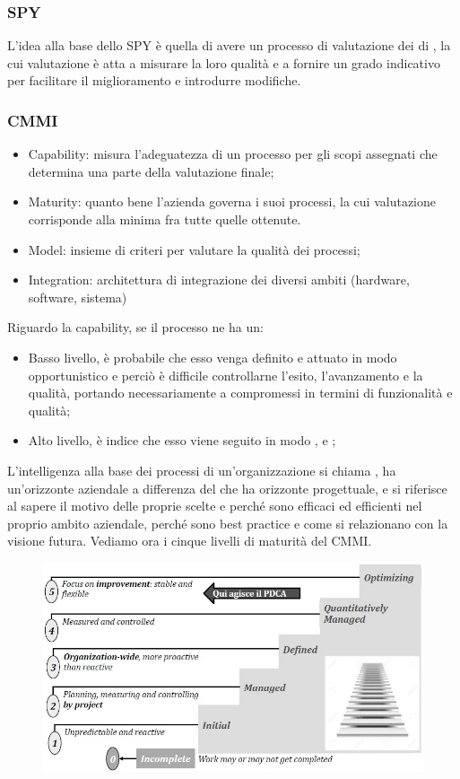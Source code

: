\documentclass[../main]{subfiles}
\begin{document}
\subsubsection{SPY}
L'idea alla base dello SPY è quella di avere un processo di valutazione dei  di , la cui valutazione è atta a misurare la loro qualità e a fornire un grado indicativo per facilitare il miglioramento e introdurre modifiche.
\subsubsection{CMMI}
\begin{itemize}
    \item Capability: misura l'adeguatezza di un processo per gli scopi assegnati che determina una parte della valutazione finale;
    \item Maturity: quanto bene l'azienda governa i suoi processi, la cui valutazione corrisponde alla minima fra tutte quelle ottenute.
    \item Model: insieme di criteri per valutare la qualità dei processi;
    \item Integration: architettura di integrazione dei diversi ambiti (hardware, software, sistema)
\end{itemize}
Riguardo la capability, se il processo ne ha un:
\begin{itemize}
    \item Basso livello, è probabile che esso venga definito e attuato in modo opportunistico e perciò è difficile controllarne l'esito, l'avanzamento e la qualità, portando necessariamente a compromessi in termini di funzionalità e qualità;
    \item Alto livello, è indice che esso viene seguito in modo ,  e ;
\end{itemize}
L'intelligenza alla base dei processi di un'organizzazione si chiama , ha un'orizzonte aziendale a differenza del  che ha orizzonte progettuale, e si riferisce al sapere il motivo delle proprie scelte e perché sono efficaci ed efficienti nel proprio ambito aziendale, perché sono best practice e come si relazionano con la visione futura.\newline
Vediamo ora i cinque livelli di maturità del CMMI.
\begin{figure}[h]
    \begin{center}
        \includegraphics[scale=0.8]{immagini/maturita.jpg}
    \end{center}
\end{figure}
\end{document}
